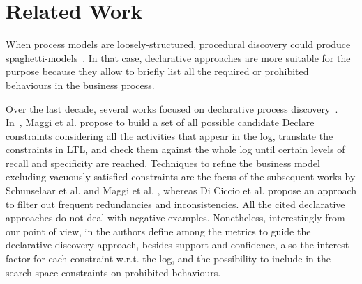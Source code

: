 
\section{Related Work}
\label{sec:related}




When process models are loosely-structured, procedural discovery could produce spaghetti-models~\cite{2012-Maggi,deviant-tkde}. In that case, declarative approaches are more suitable for the purpose because they allow to briefly list all the required or prohibited behaviours in the business process. 

Over the last decade, several works focused on declarative process discovery~\cite{2011-Maggi,2012-Maggi,2012-Schunselaar,2017-DiCiccio,2015-DiCiccio}.
In~\cite{2011-Maggi}, Maggi et al. propose to build a set of all possible candidate Declare constraints considering all the activities that appear in the log, translate the constraints in \ac{LTL}, and check them against the whole log until certain levels of recall and specificity are reached. 
Techniques to refine the business model excluding vacuously satisfied constraints are the focus of the subsequent works by Schunselaar et al. \cite{2012-Schunselaar} and Maggi et al. \cite{2012-Maggi}, whereas Di Ciccio et al. \cite{2017-DiCiccio} propose an approach to filter out frequent redundancies and inconsistencies. 
All the cited declarative approaches do not deal with negative examples. Nonetheless, interestingly from our point of view, in \cite{2015-DiCiccio}  the authors define among the metrics to guide the declarative discovery approach, besides support and confidence, also the interest factor for each constraint w.r.t. the log, and the possibility to include in the search space constraints on prohibited behaviours.

